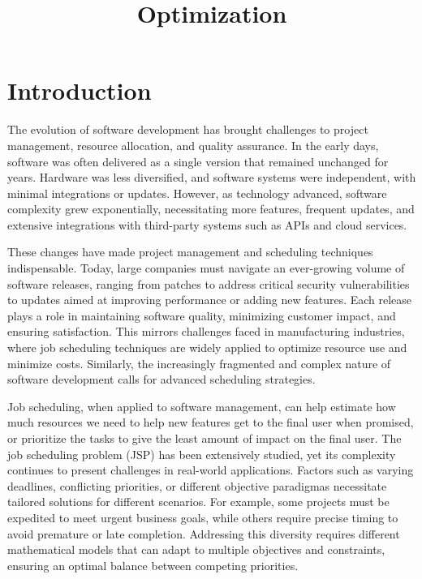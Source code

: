 \documentclass[12pt]{article}
\title{Optimization}
\author{}
\date{}
\begin{document}
\maketitle

\section*{Introduction}

The evolution of software development has brought challenges to project management, resource allocation, and quality assurance. In the early days, software was often delivered as a single version that remained unchanged for years. Hardware was less diversified, and software systems were independent, with minimal integrations or updates. However, as technology advanced, software complexity grew exponentially, necessitating more features, frequent updates, and extensive integrations with third-party systems such as APIs and cloud services.

These changes have made project management and scheduling techniques indispensable. Today, large companies must navigate an ever-growing volume of software releases, ranging from patches to address critical security vulnerabilities to updates aimed at improving performance or adding new features. Each release plays a role in maintaining software quality, minimizing customer impact, and ensuring satisfaction. This mirrors challenges faced in manufacturing industries, where job scheduling techniques are widely applied to optimize resource use and minimize costs. Similarly, the increasingly fragmented and complex nature of software development calls for advanced scheduling strategies. 

Job scheduling, when applied to software management, can help estimate how much resources we need to help new features get to the final user when promised, or prioritize the tasks to give the least amount of impact on the final user. The job scheduling problem (JSP) has been extensively studied, yet its complexity continues to present challenges in real-world applications. Factors such as varying deadlines, conflicting priorities, or different objective paradigmas necessitate tailored solutions for different scenarios. For example, some projects must be expedited to meet urgent business goals, while others require precise timing to avoid premature or late completion. Addressing this diversity requires different mathematical models that can adapt to multiple objectives and constraints, ensuring an optimal balance between competing priorities.
\end{document}
